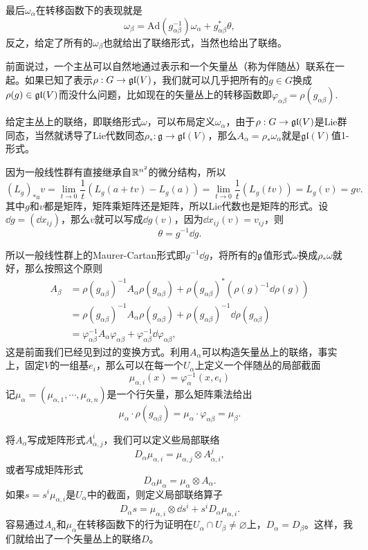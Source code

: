 最后$\omega_\alpha$在转移函数下的表现就是
\[
	\omega_\beta=\mathrm{Ad}(g_{\alpha\beta}^{-1})\omega_\alpha+g_{\alpha\beta}^*\theta,
\]
反之，给定了所有的$\omega_\beta$也就给出了联络形式，当然也给出了联络。

前面说过，一个主丛可以自然地通过表示和一个矢量丛（称为伴随丛）联系在一起。如果已知了表示$\rho:G\to \mathfrak{gl}(V)$，我们就可以几乎把所有的$g\in G$换成$\rho(g)\in \mathfrak{gl}(V)$而没什么问题，比如现在的矢量丛上的转移函数即$\varphi_{\alpha\beta}=\rho(g_{\alpha\beta})$.

给定主丛上的联络，即联络形式$\omega$，可以布局定义$\omega_\alpha$，由于$\rho:G\to \mathfrak{gl}(V)$是Lie群同态，当然就诱导了Lie代数同态$\rho_*:\mathfrak{g}\to \mathfrak{gl}(V)$，那么$A_\alpha=\rho_*\omega_\alpha$就是$\mathfrak{gl}(V)$值1-形式。

因为一般线性群有直接继承自$\mathbb{R}^{n^2}$的微分结构，所以
\[
	(L_g)_{*a}v=\lim_{t\to 0}\frac{1}{t}(L_g(a+tv)-L_g(a))=\lim_{t\to 0}\frac{1}{t}(L_g(tv))=L_g(v)=gv.
\]
其中$g$和$v$都是矩阵，矩阵乘矩阵还是矩阵，所以Lie代数也是矩阵的形式。设$\dd g=(\dd x_{ij})$，那么$v$就可以写成$\dd g(v)$，因为$\dd x_{ij}(v)=v_{ij}$，则
\[
	\theta=g^{-1}\dd g.
\]

所以一般线性群上的Maurer-Cartan形式即$g^{-1}\dd g$，将所有的${\mathfrak{g}}$值形式$\omega$换成$\rho_*\omega$就好，那么按照这个原则
\begin{align*}
	A_\beta&=\rho(g_{\alpha\beta})^{-1}A_\alpha\rho(g_{\alpha\beta})+\rho(g_{\alpha\beta})^*\left(\rho(g)^{-1}\dd \rho(g)\right)\\
	&=\rho(g_{\alpha\beta})^{-1}A_\alpha\rho(g_{\alpha\beta})+\rho(g_{\alpha\beta})^{-1}\dd \rho(g_{\alpha\beta})\\
	&=\varphi_{\alpha\beta}^{-1}A_\alpha\varphi_{\alpha\beta}+\varphi_{\alpha\beta}^{-1}\dd \varphi_{\alpha\beta},
\end{align*}
这是前面我们已经见到过的变换方式。利用$A_\alpha$可以构造矢量丛上的联络，事实上，固定$V$的一组基$e_i$，那么可以在每一个$U_\alpha$上定义一个伴随丛的局部截面
\[
	\mu_{\alpha,i}(x)=\varphi_\alpha^{-1}(x,e_i)
\]
记$\mu_\alpha=(\mu_{\alpha,1},\cdots,\mu_{\alpha,n})$是一个行矢量，那么矩阵乘法给出
\[
	\mu_\alpha\cdot \rho(g_{\alpha\beta})=\mu_\alpha\cdot \varphi_{\alpha\beta}=\mu_\beta.
\]

将$A_\alpha$写成矩阵形式$A^i_{\alpha,j}$，我们可以定义些局部联络
\[
	D_\alpha\mu_{\alpha,i}=\mu_{\alpha,j}\otimes A^j_{\alpha,i},
\]
或者写成矩阵形式
\[
	D_\alpha\mu_{\alpha}=\mu_{\alpha}\otimes A_\alpha.
\]
如果$s=s^i\mu_{\alpha,i}$是$U_\alpha$中的截面，则定义局部联络算子
\[
	D_\alpha s=\mu_{\alpha,i}\otimes \dd s^i+s^iD_\alpha\mu_{\alpha,i}.
\]
容易通过$A_\alpha$和$\mu_\alpha$在转移函数下的行为证明在$U_\alpha\cap U_\beta\neq \varnothing$上，$D_\alpha=D_\beta$。这样，我们就给出了一个矢量丛上的联络$D$。

